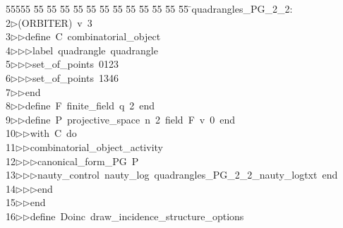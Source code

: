 %
%
\begin{tabbing}
55555 \= 55 \= 55 \= 55 \= 55 \= 55 \= 55 \= 55 \= 55 \= 55 \= 55 \= 55 \= 55 \= \>quadrangles\_PG\_2\_2:\\[0pt]
2\>$\triangleright$\>(ORBITER)\ v\ 3\ \\[0pt]
3\>$\triangleright$\>$\triangleright$\>define\ C\ combinatorial\_object\ \\[0pt]
4\>$\triangleright$\>$\triangleright$\>$\triangleright$\>label\ quadrangle\ quadrangle\ \\[0pt]
5\>$\triangleright$\>$\triangleright$\>$\triangleright$\>set\_of\_points\ 0123\ \\[0pt]
6\>$\triangleright$\>$\triangleright$\>$\triangleright$\>set\_of\_points\ 1346\ \\[0pt]
7\>$\triangleright$\>$\triangleright$\>end\ \\[0pt]
8\>$\triangleright$\>$\triangleright$\>define\ F\ finite\_field\ q\ 2\ end\ \\[0pt]
9\>$\triangleright$\>$\triangleright$\>define\ P\ projective\_space\ n\ 2\ field\ F\ v\ 0\ end\ \\[0pt]
10\>$\triangleright$\>$\triangleright$\>with\ C\ do\ \\[0pt]
11\>$\triangleright$\>$\triangleright$\>combinatorial\_object\_activity\ \\[0pt]
12\>$\triangleright$\>$\triangleright$\>$\triangleright$\>canonical\_form\_PG\ P\ \\[0pt]
13\>$\triangleright$\>$\triangleright$\>$\triangleright$\>nauty\_control\ nauty\_log\ quadrangles\_PG\_2\_2\_nauty\_logtxt\ end\ \\[0pt]
14\>$\triangleright$\>$\triangleright$\>$\triangleright$\>end\ \\[0pt]
15\>$\triangleright$\>$\triangleright$\>end\ \\[0pt]
16\>$\triangleright$\>$\triangleright$\>define\ Doinc\ draw\_incidence\_structure\_options\ \\[0pt]

\end{tabbing}
